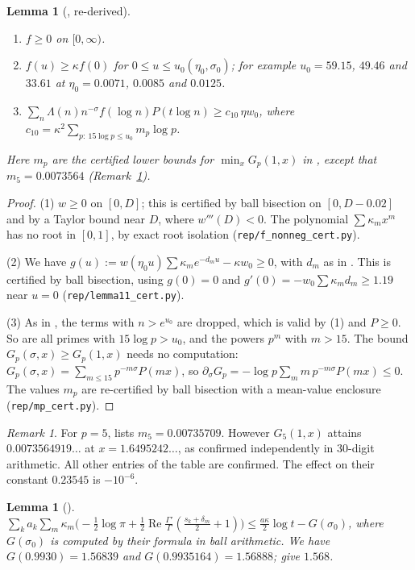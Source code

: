 \documentclass[11pt]{amsart}
\numberwithin{equation}{section}
\newtheorem{lemma}[theorem]{Lemma}
\theoremstyle{definition}
\theoremstyle{remark}
\newtheorem{remark}[theorem]{Remark}
\newcommand{\Rp}{\operatorname{Re}}
\newcommand{\code}[1]{\texttt{#1}}
\begin{document}
\begin{lemma}[{\cite[Lemmas~3, 10, 11]{BTY}}, re-derived]\label{lem:L1011}
\begin{enumerate}
\item $f \ge 0$ on $[0,\infty)$.
\item $f(u) \ge \kappa f(0)$ for $0 \le u \le u_0(\eta_0,\sigma_0)$; for example $u_0 = 59.15$, $49.46$ and $33.61$ at $\eta_0 = 0.0071$, $0.0085$ and $0.0125$.
\item $\sum_n\Lambda(n)n^{-\sigma}f(\log n)P(t\log n) \ge c_{10}\,\eta w_0$, where $c_{10} = \kappa^2\sum_{p:\ 15\log p\le u_0}m_p\log p$.
\end{enumerate}
Here $m_p$ are the certified lower bounds for $\min_x G_p(1,x)$ in \cite[Table~1]{BTY}, except that $m_5 = 0.0073564$ (Remark~\ref{rem:m5}).
\end{lemma}

\begin{proof}
(1) $w \ge 0$ on $[0,D]$; this is certified by ball bisection on $[0,D-0.02]$ and by a Taylor bound near $D$, where $w'''(D) < 0$.
The polynomial $\sum\kappa_mx^m$ has no root in $[0,1]$, by exact root isolation (\code{rep/f\_nonneg\_cert.py}).

(2) We have $g(u) := w(\eta_0u)\sum\kappa_me^{-d_mu} - \kappa w_0 \ge 0$, with $d_m$ as in \cite[Lemma~11]{BTY}.
This is certified by ball bisection, using $g(0) = 0$ and $g'(0) = -w_0\sum\kappa_md_m \ge 1.19$ near $u = 0$ (\code{rep/lemma11\_cert.py}).

(3) As in \cite[Lemma~10]{BTY}, the terms with $n > e^{u_0}$ are dropped, which is valid by (1) and $P \ge 0$.
So are all primes with $15\log p > u_0$, and the powers $p^m$ with $m > 15$.
The bound $G_p(\sigma,x) \ge G_p(1,x)$ needs no computation: $G_p(\sigma,x) = \sum_{m\le15}p^{-m\sigma}P(mx)$, so $\partial_\sigma G_p = -\log p\sum_m m\,p^{-m\sigma}P(mx) \le 0$.
The values $m_p$ are re-certified by ball bisection with a mean-value enclosure (\code{rep/mp\_cert.py}).
\end{proof}

\begin{remark}\label{rem:m5}
For $p = 5$, \cite[Table~1]{BTY} lists $m_5 = 0.00735709$.
However $G_5(1,x)$ attains $0.0073564919\ldots$ at $x = 1.6495242\ldots$, as confirmed independently in $30$-digit arithmetic.
All other entries of the table are confirmed.
The effect on their constant $0.23545$ is $-10^{-6}$.
\end{remark}

\begin{lemma}[{\cite[Lemma~12]{BTY}}]\label{lem:L12}
$\sum_k a_k\sum_m\kappa_m\big(-\frac12\log\pi + \frac12\Rp\frac{\Gamma'}{\Gamma}(\frac{s_k+\delta_m}2+1)\big) \le \frac{a\kappa}2\log t - G(\sigma_0)$, where $G(\sigma_0)$ is computed by their formula in ball arithmetic.
We have $G(0.9930) = 1.56839$ and $G(0.9935164) = 1.56888$; \cite{BTY} give $1.568$.
\end{lemma}
\end{document}
